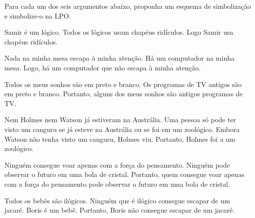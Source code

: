 \problempart
\label{pr.FOLarguments}
Para cada um dos seis argumentos abaixo, proponha um esquema de simbolização e simbolize-o na LPO.
\begin{earg}
\item Samir é um lógico. Todos os lógicos usam chapéus ridículos. Logo Samir usa chapéus ridículos.

\item Nada na minha mesa escapa à minha atenção. Há um computador na minha mesa. Logo, há um computador que não escapa à minha atenção.

\item Todos os meus sonhos são em preto e branco. Os programas de TV antigos são em preto e branco. Portanto, alguns dos meus sonhos são antigos programas de TV.

\item Nem Holmes nem Watson já estiveram na Austrália. Uma pessoa só pode ter visto um canguru se já esteve na Austrália ou se foi em um zoológico. Embora Watson não tenha visto um canguru, Holmes viu. Portanto, Holmes foi a um zoológico.

\item Ninguém consegue voar apenas com a força do pensamento. Ninguém pode observar o futuro em uma bola de cristal. Portanto, quem consegue voar apenas com a força do pensamento pode observar o futuro em uma bola de cristal.

\item Todos os bebês são ilógicos. Ninguém que é ilógico consegue escapar de um jacaré. Boris é um bebê. Portanto, Boris não consegue escapar de um jacaré.

\end{earg}



